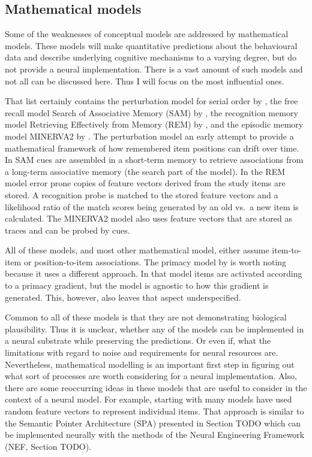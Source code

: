 \subsection{Mathematical models}
Some of the weaknesses of conceptual models are addressed by mathematical models.
These models will make quantitative predictions about the behavioural data and describe underlying cognitive mechanisms to a varying degree, but do not provide a neural implementation.
There is a vast amount of such models and not all can be discussed here.
Thus I will focus on the most influential ones.

That list certainly contains the perturbation model for serial order by \textcite{Estes1972}, the free recall model Search of Associative Memory (SAM) by \textcite{Raaijmakers1981}, the recognition memory model Retrieving Effectively from Memory (REM) by \textcite{Shiffrin1997}, and the episodic memory model MINERVA2 by \textcite{Hintzman1988}.
The perturbation model an early attempt to provide a mathematical framework of how remembered item positions can drift over time.
In SAM cues are assembled in a short-term memory to retrieve associations from a long-term associative memory (the search part of the model).
In the REM model error prone copies of feature vectors derived from the study items are stored.
A recognition probe is matched to the stored feature vectors and a likelihood ratio of the match scores being generated by an old vs.\ a new item is calculated.
The MINERVA2 model also uses feature vectors that are stored as traces and can be probed by cues.

All of these models, and most other mathematical model, either assume item-to-item or position-to-item associations.
The primacy model by \textcite{Page1998} is worth noting because it uses a different approach.
In that model items are activated according to a primacy gradient, but the model is agnostic to how this gradient is generated.
This, however, also leaves that aspect underspecified.

Common to all of these models is that they are not demonstrating biological plausibility.
Thus it is unclear, whether any of the models can be implemented in a neural substrate while preserving the predictions.
Or even if, what the limitations with regard to noise and requirements for neural resources are.
Nevertheless, mathematical modelling is an important first step in figuring out what sort of processes are worth considering for a neural implementation.
Also, there are some reoccurring ideas in these models that are useful to consider in the context of a neural model.
For example, starting with \textcite{Anderson1973} many models have used random feature vectors to represent individual items.
That approach is similar to the Semantic Pointer Architecture (SPA) presented in Section TODO which can be implemented neurally with the methods of the Neural Engineering Framework (NEF, Section TODO).

